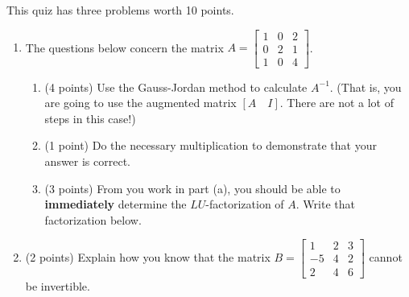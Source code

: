 \documentclass[11pt,fleqn]{article}
\def\bbm{\begin{bmatrix}}
\def\ebm{\end{bmatrix}}
\begin{document}
\renewcommand{\headrulewidth}{0pt}
\newcommand{\blank}[1]{\rule{#1}{0.75pt}}
\renewcommand{\d}{\displaystyle}

This quiz has three problems worth 10 points.
\begin{enumerate}
\item  The questions below concern the matrix $A=\bbm 1&0&2\\0&2&1\\1&0&4\ebm$.
	\begin{enumerate}
	\item (4 points) Use the Gauss-Jordan method to calculate $A^{-1}$. (That is, you are going to use the augmented matrix $[A  \quad I].$ There are not a lot of steps in this case!)
	\vfill
	
	\vfill
	\item (1 point) Do the necessary multiplication to demonstrate that your answer is correct.
	\vfill
	\item (3 points) From you work in part (a), you should be able to \textbf{immediately} determine the $LU$-factorization of $A.$ Write that factorization below.
	\vfill
	\end{enumerate}
\newpage
\item (2 points) Explain how you know that the matrix $B=\bbm 1&2&3\\-5&4&2\\ 2 &4&6 \ebm$ cannot be invertible.
 \vspace{1in}
 
\end{enumerate}
\end{document}
